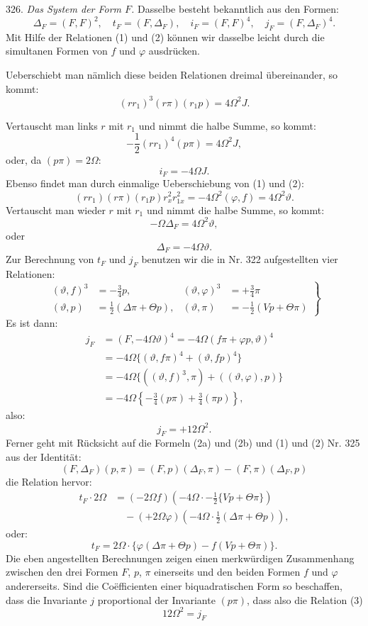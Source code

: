 \documentclass[11pt]{article}
\providecommand{\weberpage}[1]{}
\providecommand{\weq}[2]{\begin{equation}\tag{#1}#2\end{equation}}
\let\Delta\varDelta
\let\Theta\varTheta
\let\Omega\varOmega
\begin{document}
326. \textit{Das System der Form $F$.} Dasselbe besteht bekanntlich aus
den Formen:
\[
\Delta_F=(F,F)^2,\quad t_F=(F,\Delta_F),\quad i_F=(F,F)^4,\quad j_F=(F,\Delta_F)^4.
\]
Mit Hilfe der Relationen (1) und (2) können wir dasselbe leicht durch
die simultanen Formen von $f$ und $\varphi$ ausdrücken.

Ueberschiebt man nämlich diese beiden Relationen dreimal übereinander,
so kommt:
\[
(rr_1)^3(r\pi)(r_1p)=4\Omega^2J.
\]


\weberpage{349}
Vertauscht man links $r$ mit $r_1$ und nimmt die halbe Summe, so kommt:
\[
-\frac{1}{2}(rr_1)^4(p\pi) = 4\Omega^2J,
\]
oder, da $(p\pi)=2\Omega$:
\weq{1}{i_F = -4\Omega J.}
Ebenso findet man durch einmalige Ueberschiebung von (1) und (2):
\[
(rr_1)(r\pi)(r_1p)r_x^2r_{1x}^2 = -4\Omega^2(\varphi,f) = 4\Omega^2\vartheta.
\]
Vertauscht man wieder $r$ mit $r_1$ und nimmt die halbe Summe, so kommt:
\[
-\Omega\Delta_F = 4\Omega^2\vartheta,
\]
oder
\weq{2a}{\Delta_F = -4\Omega\vartheta.}
Zur Berechnung von $t_F$ und $j_F$ benutzen wir die in Nr. 322 aufgestellten vier Relationen:
\weq{2b}{\left.
\begin{aligned}
(\vartheta,f)^3 &= -\frac{3}{4}p, & (\vartheta,\varphi)^3 &= +\frac{3}{4}\pi\\
(\vartheta,p) &= \frac{1}{2}(\Delta\pi+\Theta p), & (\vartheta,\pi) &= -\frac{1}{2}(Vp+\Theta\pi)
\end{aligned}
\right\}}
Es ist dann:
\[
\begin{aligned}
j_F &= (F,-4\Omega\vartheta)^4 = -4\Omega(f\pi+\varphi p,\vartheta)^4\\
&= -4\Omega\{(\vartheta,f\pi)^4+(\vartheta,fp)^4\}\\
&= -4\Omega\{((\vartheta,f)^3,\pi)+((\vartheta,\varphi),p)\}\\
&= -4\Omega\left\{-\frac{3}{4}(p\pi)+\frac{3}{4}(\pi p)\right\},
\end{aligned}
\]
also:
\weq{3}{j_F = +12\Omega^2.}
Ferner geht mit R\"ucksicht auf die Formeln (2a) und (2b) und (1) und (2) Nr. 325 aus der Identit\"at:
\[
(F,\Delta_F)(p,\pi) = (F,p)(\Delta_F,\pi) - (F,\pi)(\Delta_F,p)
\]
die Relation hervor:
\[
\begin{aligned}
t_F\cdot 2\Omega &= (-2\Omega f)\left(-4\Omega\cdot-\frac{1}{2}\{Vp+\Theta\pi\}\right)\\
&\quad -(+2\Omega\varphi)\left(-4\Omega\cdot\frac{1}{2}(\Delta\pi+\Theta p)\right),
\end{aligned}
\]
oder:
\weq{4}{t_F = 2\Omega\cdot\{\varphi(\Delta\pi+\Theta p)-f(Vp+\Theta\pi)\}.}
Die eben angestellten Berechnungen zeigen einen merkw\"urdigen Zusammenhang zwischen den drei Formen $F$, $p$, $\pi$ einerseits und den beiden Formen $f$ und $\varphi$ andererseits. Sind die Co\"efficienten einer biquadratischen Form so beschaffen, dass die Invariante $j$ proportional der Invariante $(p\pi)$, dass also die Relation (3)
\[
12\Omega^2 = j_F
\]
\end{document}
